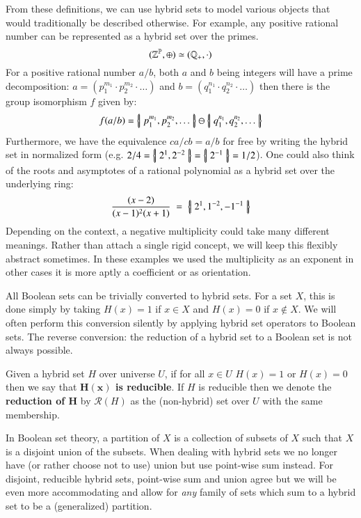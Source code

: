 From these definitions, we can use hybrid sets to model various objects that would traditionally be described otherwise. 
For example, any positive rational number can be represented as a hybrid set over the primes.
\begin{equation*}
	(\mathbb{Z}^\mathbb{P}, \oplus) \simeq (\mathbb{Q}_+,\cdot)
\end{equation*}
For a positive rational number $a/b$, both $a$ and $b$ being integers will have a prime decomposition: 
$a=(p_1^{m_1}\cdot p_2^{m_2} \cdot \ldots)$ and $b=(q_1^{n_1} \cdot q_2^{n_2} \cdot \ldots)$
then there is the group isomorphism $f$ given by:
\begin{equation*}
	f(a/b) = \left\{ \! \left| \; p_1^{m_1}, p_2^{m_2}, \ldots \; \right| \! \right\} \ominus \left\{ \! \left| \; q_1^{n_1}, q_2^{n_2}, \ldots \; \right| \! \right\}
\end{equation*}
Furthermore, we have the equivalence $ca/cb = a/b$ for free by writing the hybrid set in normalized form
(e.g. $2/4 = \left\{ \! \left| \; 2^1, 2^{-2} \; \right| \! \right\} = \left\{ \! \left| \; 2^{-1} \; \right| \! \right\} = 1/2$).
One could also think of the roots and asymptotes of a rational polynomial as a hybrid set over the underlying ring:
\begin{equation*}
	\frac{(x-2)}{(x-1)^2(x+1)} \;=\; \left\{ \! \left| \;  2^1, 1^{-2}, -1^{-1}  \; \right| \! \right\}
\end{equation*}
Depending on the context, a negative multiplicity could take many different meanings.
Rather than attach a single rigid concept, we will keep this flexibly abstract sometimes.
In these examples we used the multiplicity as an exponent in other cases it is more aptly a coefficient  or as orientation.


All Boolean sets can be trivially converted to hybrid sets.
For a set $X$, this is done simply by taking $H(x)=1$ if $x \in X$ and $H(x)=0$ if $x \notin X$.
We will often perform this conversion silently by applying hybrid set operators to Boolean sets.
The reverse conversion: the reduction of a hybrid set to a Boolean set is not always possible.


\begin{definition}
	Given a hybrid set $H$ over universe $U$, 
	if for all $x \in U$ $H(x)=1$ or $H(x)=0$ then we say that \textbf{$\boldsymbol{H(x)}$ is reducible}.
	If $H$ is reducible then we denote the \textbf{reduction of $\boldsymbol{H}$} by $\mathcal{R}(H)$ 
	as the (non-hybrid) set over $U$ with the same membership.  
\end{definition}


In Boolean set theory, a partition of $X$ is a collection of subsets of $X$ such that $X$ is a disjoint union of the subsets.
When dealing with hybrid sets we no longer have (or rather choose not to use) union but use point-wise sum instead.
For disjoint, reducible hybrid sets, point-wise sum and union agree but we will be even more accommodating 
and allow for \emph{any} family of sets which sum to a hybrid set to be a (generalized) partition.


